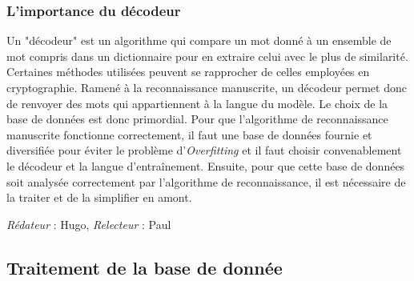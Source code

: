 \documentclass[oneside,a4paper,13pt]{article}
\begin{document}
\subsubsection{L'importance du décodeur}
Un "décodeur" est un algorithme qui compare un mot donné à un ensemble de mot compris dans un dictionnaire pour en extraire celui avec le plus de similarité. Certaines méthodes utilisées peuvent se rapprocher de celles employées en cryptographie. Ramené à la reconnaissance manuscrite, un décodeur permet donc de renvoyer des mots qui appartiennent à la langue du modèle.
\bigbreak
Le choix de la base de données est donc primordial. Pour que l'algorithme de reconnaissance manuscrite fonctionne correctement, il faut une base de données fournie et diversifiée pour éviter le problème d'\textit{Overfitting} et il faut choisir convenablement le décodeur et la langue d'entraînement. Ensuite, pour que cette base de données soit analysée correctement par l'algorithme de reconnaissance, il est nécessaire de la traiter et de la simplifier en amont. 

\smallbreak\textit{Rédateur} : Hugo, \textit{Relecteur} : Paul

\subsection{Traitement de la base de donnée}
\end{document}
